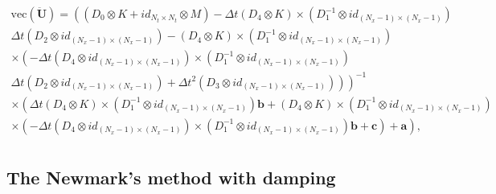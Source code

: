 \documentclass[a4paper, 10pt]{article}
\begin{document}
$$
\begin{array}{c}
\mathrm{vec}(\ddot{\mathbf{U}}) = \left(\left(D_0 \otimes K + id_{N_t \times N_t} \otimes  M  \right) - \Delta t \left(D_4 \otimes  K \right) \times \left( D_1^{-1} \otimes  id_{(N_x-1)\times(N_x-1)}\right)   \right.\\
\left. \Delta t \left( D_2 \otimes  id_{(N_x-1)\times(N_x-1)}\right) -  \left( D_4 \otimes   K\right) \times \left( D_1^{-1} \otimes  id_{(N_x-1)\times(N_x-1)}\right) \right. \\
\left.  \times \left( - \Delta t \left(D_4 \otimes  id_{(N_x-1)\times(N_x-1)} \right) \times \left( D_1^{-1} \otimes  id_{(N_x-1)\times(N_x-1)}\right) \right. \right. \\
\left. \left. \Delta t \left( D_2 \otimes  id_{(N_x-1)\times(N_x-1)}\right)  + \Delta t^2 \left( D_3 \otimes  id_{(N_x-1)\times(N_x-1)} \right) \right) \right)^{-1} \\
\times \left( \Delta t \left(D_4 \otimes  K \right) \times \left( D_1^{-1} \otimes  id_{(N_x-1)\times(N_x-1)}\right)  \mathbf{b} +\left( D_4 \otimes   K\right) \times \left( D_1^{-1} \otimes  id_{(N_x-1)\times(N_x-1)}\right) \right. \\
\left.  \times \left( - \Delta t \left(D_4 \otimes  id_{(N_x-1)\times(N_x-1)} \right) \times \left( D_1^{-1} \otimes  id_{(N_x-1)\times(N_x-1)}\right) \mathbf{b}  + \mathbf{c}  \right) + \mathbf{a}  \right), \\
\end{array}
$$





\subsection{The Newmark's method with damping}
\end{document}
